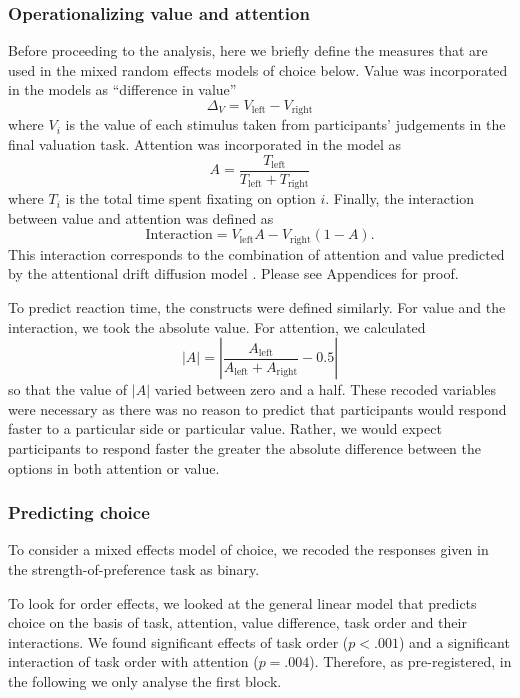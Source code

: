 \documentclass[doc, a4paper, apacite]{apa6}
\begin{document}
\subsubsection{Operationalizing value and attention}
Before proceeding to the analysis, here we briefly define the measures that are used in the mixed random effects models of choice below. Value was incorporated in the models as ``difference in value'' 
\begin{equation}
	\Delta_V = V_\text{left} - V_\text{right}
\end{equation}
where $V_i$ is the value of each stimulus taken from participants' judgements in the final valuation task. Attention was incorporated in the model as 
\begin{equation}
	A = \frac{T_\text{left}}{T_\text{left}+T_\text{right}}
\end{equation}
where $T_i$ is the total time spent fixating on option $i$. Finally, the interaction between value and attention was defined as
\begin{equation}
	\text{Interaction} = V_\text{left} A - V_\text{right} (1-A).
\end{equation}
This interaction corresponds to the combination of attention and value predicted by the attentional drift diffusion model \cite{Krajbich2010}. Please see Appendices for proof. 

To predict reaction time, the constructs were defined similarly. For value and the interaction, we took the absolute value. For attention, we calculated
\begin{equation}
	|A| = \left| \frac{A_\text{left}}{A_\text{left}+A_\text{right}} - 0.5 \right| 
\end{equation}
so that the value of $|A|$ varied between zero and a half. These recoded variables were necessary as there was no reason to predict that participants would respond faster to a particular side or particular value. Rather, we would expect participants to respond faster the greater the absolute difference between the options in both attention or value. 

\subsubsection{Predicting choice}
To consider a mixed effects model of choice, we recoded the responses given in the strength-of-preference task as binary.

To look for order effects, we looked at the general linear model that predicts choice on the basis of task, attention, value difference, task order and their interactions. We found significant effects of task order ($p<.001$) and a significant interaction of task order with attention ($p=.004$). Therefore, as pre-registered, in the following we only analyse the first block. 
\end{document}
